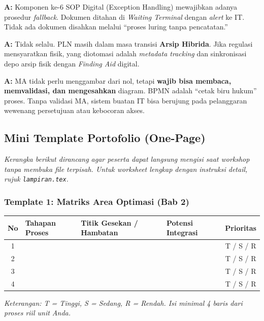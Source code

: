 \documentclass[11pt,a4paper]{article}
\begin{document}
\begin{faqbox}
\textbf{A:} Komponen ke-6 SOP Digital (Exception Handling) mewajibkan adanya prosedur \textit{fallback}. Dokumen ditahan di \textit{Waiting Terminal} dengan \textit{alert} ke IT. Tidak ada dokumen disahkan melalui ``proses luring tanpa pencatatan.''
\end{faqbox}

\begin{faqbox}
\textbf{A:} Tidak selalu. PLN masih dalam masa transisi \textbf{Arsip Hibrida}. Jika regulasi mensyaratkan fisik, yang diotomasi adalah \textit{metadata tracking} dan sinkronisasi depo arsip fisik dengan \textit{Finding Aid} digital.
\end{faqbox}

\begin{faqbox}
\textbf{A:} MA tidak perlu menggambar dari nol, tetapi \textbf{wajib bisa membaca, memvalidasi, dan mengesahkan} diagram. BPMN adalah ``cetak biru hukum'' proses. Tanpa validasi MA, sistem buatan IT bisa berujung pada pelanggaran wewenang persetujuan atau kebocoran akses.
\end{faqbox}

\newpage

\subsection{Mini Template Portofolio (One-Page)}
\textit{Kerangka berikut dirancang agar peserta dapat langsung mengisi saat workshop tanpa membuka file terpisah. Untuk worksheet lengkap dengan instruksi detail, rujuk \texttt{lampiran.tex}.}

\subsubsection*{Template 1: Matriks Area Optimasi (Bab 2)}
\begin{table}[h!]
\centering\small
\renewcommand{\arraystretch}{1.8}
\begin{tabularx}{\textwidth}{@{} c X X X c @{}}
\toprule
\textbf{No} & \textbf{Tahapan Proses} & \textbf{Titik Gesekan / Hambatan} & \textbf{Potensi Integrasi} & \textbf{Prioritas} \\
\midrule
1 & & & & T / S / R \\
\hline
2 & & & & T / S / R \\
\hline
3 & & & & T / S / R \\
\hline
4 & & & & T / S / R \\
\bottomrule
\end{tabularx}
\end{table}
\textit{Keterangan: T = Tinggi, S = Sedang, R = Rendah. Isi minimal 4 baris dari proses riil unit Anda.}
\end{document}
